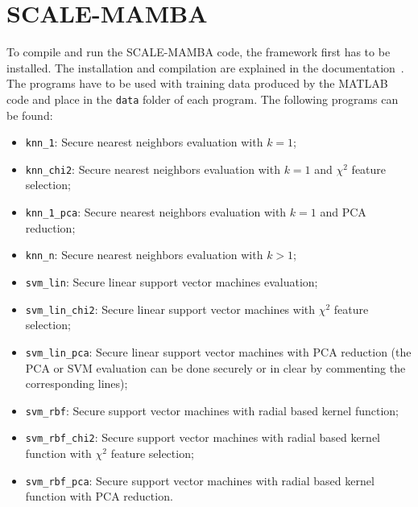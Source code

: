 \section{SCALE-MAMBA}
To compile and run the SCALE-MAMBA code, the framework first has to be installed. The installation and compilation are explained in the documentation~\cite{Aly2018SCALEDocumentation}. The programs have to be used with training data produced by the MATLAB code and place in the \verb=data= folder of each program. The following programs can be found:
\begin{itemize}
    \item \verb=knn_1=: Secure nearest neighbors evaluation with $k=1$;
    \item \verb=knn_chi2=: Secure nearest neighbors evaluation with $k=1$ and $\chi^2$ feature selection;
    \item \verb=knn_1_pca=: Secure nearest neighbors evaluation with $k=1$ and PCA reduction;
    \item \verb=knn_n=: Secure nearest neighbors evaluation with $k>1$;
    \item \verb=svm_lin=: Secure linear support vector machines evaluation;
    \item \verb=svm_lin_chi2=: Secure linear support vector machines with $\chi^2$ feature selection;
    \item \verb=svm_lin_pca=: Secure linear support vector machines with PCA reduction (the PCA or SVM evaluation can be done securely or in clear by commenting the corresponding lines);
    \item \verb=svm_rbf=: Secure support vector machines with radial based kernel function;
    \item \verb=svm_rbf_chi2=: Secure support vector machines with radial based kernel function with $\chi^2$ feature selection;
    \item \verb=svm_rbf_pca=: Secure support vector machines with radial based kernel function with PCA reduction.
\end{itemize}